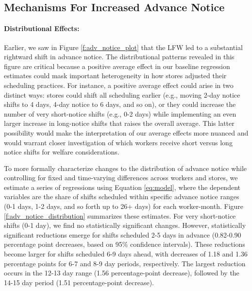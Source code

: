 \documentclass[letterpaper,11pt,leqno]{article}
\theoremstyle{paper}
\begin{document}
\subsection{Mechanisms For Increased Advance Notice} \label{subsec:adv_notice}
\paragraph{Distributional Effects:}
Earlier, we saw in Figure \ref{f:adv_notice_plot} that the LFW led to a substantial rightward shift in advance notice. The distributional patterns revealed in this figure are critical because a positive average effect in our baseline regression estimates could mask important heterogeneity in how stores adjusted their scheduling practices. For instance, a positive average effect could arise in two distinct ways: stores could shift all scheduling earlier (e.g., moving 2-day notice shifts to 4 days, 4-day notice to 6 days, and so on), or they could increase the number of very short-notice shifts (e.g., 0-2 days) while implementing an even larger increase in long-notice shifts that raises the overall average. This latter possibility would make the interpretation of our average effects more nuanced and would warrant closer investigation of which workers receive short versus long notice shifts for welfare considerations.

To more formally characterize changes to the distribution of advance notice while controlling for fixed and time-varying differences across workers and stores, we estimate a series of regressions using Equation \ref{eq:model}, where the dependent variables are the share of shifts scheduled within specific advance notice ranges (0-1 days, 1-2 days, and so forth up to 26+ days) for each worker-month. Figure \ref{f:adv_notice_distribution} summarizes these estimates. For very short-notice shifts (0-1 day), we find no statistically significant changes. However, statistically significant reductions emerge for shifts scheduled 2-5 days in advance (0.82-0.90 percentage point decreases, based on 95\% confidence intervals). These reductions become larger for shifts scheduled 6-9 days ahead, with decreases of 1.18 and 1.36 percentage points for 6-7 and 8-9 day periods, respectively. The largest reduction occurs in the 12-13 day range (1.56 percentage-point decrease), followed by the 14-15 day period (1.51 percentage-point decrease).
\end{document}
